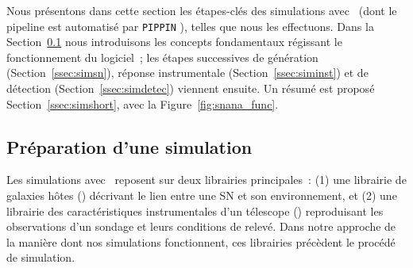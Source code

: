 \documentclass[../main/main.tex]{subfiles}
\begin{document}
Nous présentons dans cette section les étapes-clés des simulations avec \snana\
(dont le pipeline est automatisé par \texttt{PIPPIN} \citep{hinton2020}), telles
que nous les effectuons. Dans la Section~\ref{ssec:simprep} nous introduisons
les concepts fondamentaux régissant le fonctionnement du logiciel~; les étapes
successives de génération (Section~\ref{ssec:simsn}), réponse instrumentale
(Section~\ref{ssec:siminst}) et de détection (Section~\ref{ssec:simdetec})
viennent ensuite. Un résumé est proposé Section~\ref{ssec:simshort}, avec la
Figure~\ref{fig:snana_func}.

\subsection{Préparation d'une simulation}\label{ssec:simprep}

Les simulations avec \snana\ reposent sur deux librairies principales~: (1) une
librairie de galaxies hôtes (\hostlib) décrivant le lien entre une SN et son
environnement, et (2) une librairie des caractéristiques instrumentales d'un
télescope (\simlib) reproduisant les observations d'un sondage et leurs
conditions de relevé. Dans notre approche de la manière dont nos simulations
fonctionnent, ces librairies précèdent le procédé de simulation.

\subsubsection{\hostlib}\label{sssec:hostlib}
\end{document}
